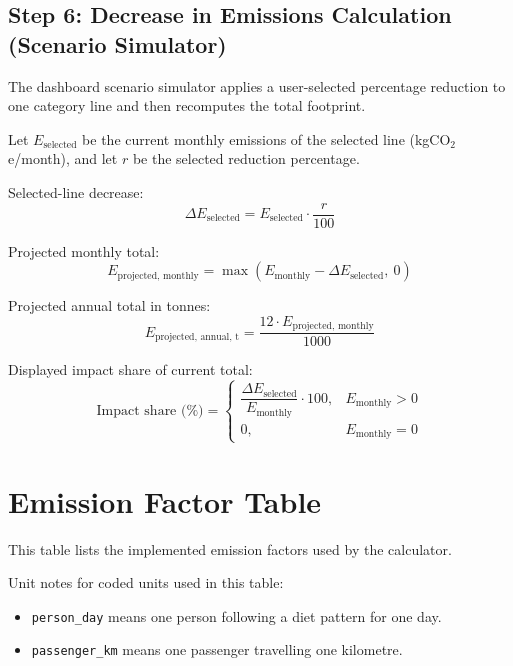 \documentclass[11pt,a4paper]{article}
\begin{document}
\subsection{Step 6: Decrease in Emissions Calculation (Scenario Simulator)}
The dashboard scenario simulator applies a user-selected percentage reduction to one category line and then recomputes the total footprint.

Let \(E_{\text{selected}}\) be the current monthly emissions of the selected line (kgCO\(_2\)e/month), and let \(r\) be the selected reduction percentage.

Selected-line decrease:
$$
\Delta E_{\text{selected}} = E_{\text{selected}} \cdot \frac{r}{100}
$$

Projected monthly total:
$$
E_{\text{projected, monthly}} =
\max\left(E_{\text{monthly}} - \Delta E_{\text{selected}},\ 0\right)
$$

Projected annual total in tonnes:
$$
E_{\text{projected, annual, t}} =
\frac{12 \cdot E_{\text{projected, monthly}}}{1000}
$$

Displayed impact share of current total:
$$
\text{Impact share (\%)} =
\begin{cases}
\dfrac{\Delta E_{\text{selected}}}{E_{\text{monthly}}} \cdot 100, & E_{\text{monthly}} > 0 \\
0, & E_{\text{monthly}} = 0
\end{cases}
$$

\section{Emission Factor Table}
This table lists the implemented emission factors used by the calculator.

Unit notes for coded units used in this table:
\begin{itemize}
  \item \texttt{person\_day} means one person following a diet pattern for one day.
  \item \texttt{passenger\_km} means one passenger travelling one kilometre.
\end{itemize}
\end{document}
